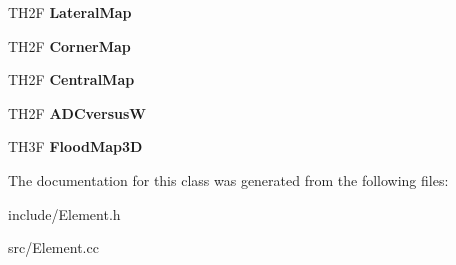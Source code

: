 \begin{DoxyCompactItemize}
\item 
\hypertarget{classElement_a82cfb891b137602dc49bbb18c1039b5c}{T\+H2\+F {\bfseries Lateral\+Map}}\label{classElement_a82cfb891b137602dc49bbb18c1039b5c}

\item 
\hypertarget{classElement_ad01d15c50d4d01716f8d9d03162521f9}{T\+H2\+F {\bfseries Corner\+Map}}\label{classElement_ad01d15c50d4d01716f8d9d03162521f9}

\item 
\hypertarget{classElement_ac25c0eb24baee3f0b3228b6279791d21}{T\+H2\+F {\bfseries Central\+Map}}\label{classElement_ac25c0eb24baee3f0b3228b6279791d21}

\item 
\hypertarget{classElement_a62ed98e003ba00fee131353869cfe314}{T\+H2\+F {\bfseries A\+D\+Cversus\+W}}\label{classElement_a62ed98e003ba00fee131353869cfe314}

\item 
\hypertarget{classElement_a97f8372319c77f20eff4314a6f32c4ad}{T\+H3\+F {\bfseries Flood\+Map3\+D}}\label{classElement_a97f8372319c77f20eff4314a6f32c4ad}

\end{DoxyCompactItemize}


The documentation for this class was generated from the following files\+:\begin{DoxyCompactItemize}
\item 
include/Element.\+h\item 
src/Element.\+cc\end{DoxyCompactItemize}
